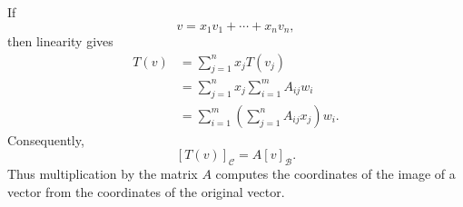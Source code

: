 If
\[
  v=x_1v_1+\cdots+x_nv_n,
\]
then linearity gives
\begin{align*}
  T(v)
  &=\sum_{j=1}^n x_jT(v_j) \\
  &=\sum_{j=1}^n x_j\sum_{i=1}^m A_{ij}w_i \\
  &=\sum_{i=1}^m\left(\sum_{j=1}^n A_{ij}x_j\right)w_i.
\end{align*}
Consequently,
\[
  [T(v)]_{\mathcal C}
  =A[v]_{\mathcal B}.
\]
Thus multiplication by the matrix $A$ computes the coordinates of the
image of a vector from the coordinates of the original vector.

